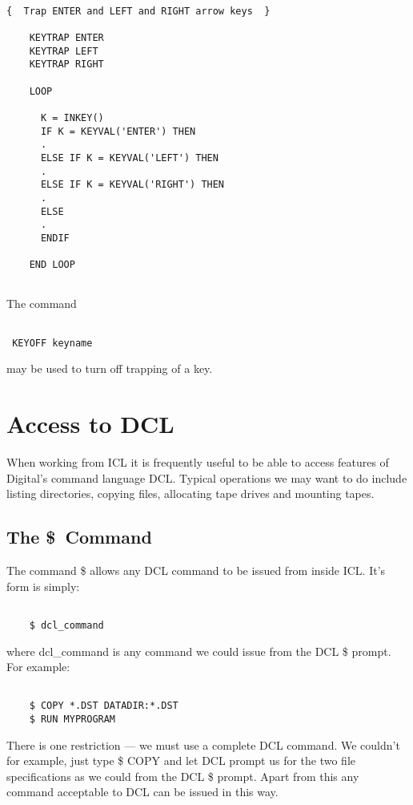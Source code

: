 \documentclass[twoside,11pt]{report}
\newcommand{\xlabel}[1]{}
\begin{document}
\begin{verbatim}
                 
{  Trap ENTER and LEFT and RIGHT arrow keys  }

    KEYTRAP ENTER
    KEYTRAP LEFT
    KEYTRAP RIGHT
                                              
    LOOP

      K = INKEY()
      IF K = KEYVAL('ENTER') THEN
      .
      ELSE IF K = KEYVAL('LEFT') THEN
      .
      ELSE IF K = KEYVAL('RIGHT') THEN
      .
      ELSE
      .
      ENDIF

    END LOOP
       
\end{verbatim}

The command
\begin{verbatim}

 KEYOFF keyname

\end{verbatim}
 may be used to turn off trapping of a key.
    

\chapter{\xlabel{access_to_dcl}Access to DCL}
When working from ICL it is frequently useful to be able to access features of
Digital's command language DCL. 
Typical operations we may want to do include listing directories, copying
files, allocating tape drives and mounting tapes.

\section{\xlabel{the_command}The \$\ Command}
The command \$ allows any DCL command to be issued from inside ICL. It's
form is simply:
\begin{verbatim}

    $ dcl_command

\end{verbatim}
where dcl\_command is any command we could issue from the DCL \$ prompt.
For example:

\begin{verbatim}

    $ COPY *.DST DATADIR:*.DST
    $ RUN MYPROGRAM

\end{verbatim}
There is one restriction --- we must use a complete DCL command. We couldn't
for example, just type \$ COPY and let DCL prompt us for the two file
specifications as we could from the DCL \$ prompt. Apart from this any
command acceptable to DCL can be issued in this way.
\end{document}
